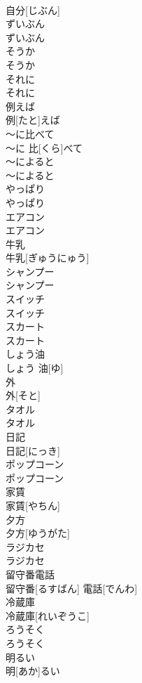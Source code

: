 \documentclass[8pt]{extreport}
\begin{document}
\begin{CJK}{UTF8}{min}
\\	自分[じぶん]
\\	ずいぶん	
\\	ずいぶん
\\	そうか	
\\	そうか
\\	それに	
\\	それに
\\	例えば	
\\	例[たと]えば
\\	〜に比べて	
\\	〜に 比[くら]べて
\\	〜によると	
\\	〜によると
\\	やっぱり	
\\	やっぱり
\\	エアコン	
\\	エアコン
\\	牛乳	
\\	牛乳[ぎゅうにゅう]
\\	シャンプー	
\\	シャンプー
\\	スイッチ	
\\	スイッチ
\\	スカート	
\\	スカート
\\	しょう油	
\\	しょう 油[ゆ]
\\	外	
\\	外[そと]
\\	タオル	
\\	タオル
\\	日記	
\\	日記[にっき]
\\	ポップコーン	
\\	ポップコーン
\\	家賃	
\\	家賃[やちん]
\\	夕方	
\\	夕方[ゆうがた]
\\	ラジカセ	
\\	ラジカセ
\\	留守番電話	
\\	留守番[るすばん] 電話[でんわ]
\\	冷蔵庫	
\\	冷蔵庫[れいぞうこ]
\\	ろうそく	
\\	ろうそく
\\	明るい	
\\	明[あか]るい

\end{CJK}
\end{document}

